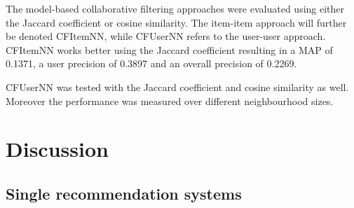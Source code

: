 \documentclass[10pt]{reportMaster}
\begin{document}
The model-based collaborative filtering approaches were evaluated using either the Jaccard coefficient or cosine similarity.
The item-item approach will further be denoted CFItemNN, while CFUserNN refers to the user-user approach.
CFItemNN works better using the Jaccard coefficient resulting in a MAP of 0.1371, a user precision of 0.3897 and an overall precision of 0.2269.

CFUserNN was tested with the Jaccard coefficient and cosine similarity as well.
Moreover the performance was measured over different neighbourhood sizes.





	




\section{Discussion}

\subsection{Single recommendation systems}
\end{document}
